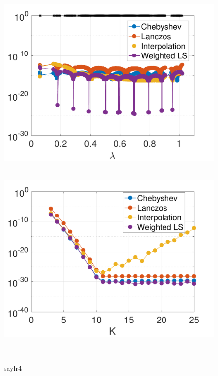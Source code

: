 \documentclass{article}
\begin{document}
\begin{figure}[bth]
\begin{minipage}[m]{0.44\linewidth}
\centerline{~~\includegraphics[width=.95\linewidth]{fig_cage9_deg10_3}}
\end{minipage}
\begin{minipage}[m]{0.44\linewidth}
\centerline{~~\includegraphics[width=.95\linewidth]{fig_cage9_err_const_b2}}
\end{minipage}\\
\begin{minipage}[m]{0.1\linewidth}
\centerline{\small{saylr4}}
\end{minipage}
\begin{minipage}[m]{0.44\linewidth}

\end{minipage}
\end{figure}
\end{document}
